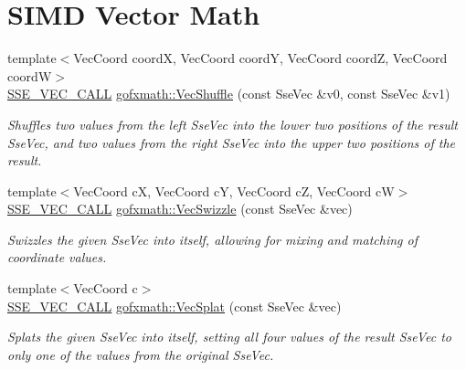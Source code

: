 \hypertarget{group___s_i_m_d_vec_math}{}\section{S\+I\+M\+D Vector Math}
\label{group___s_i_m_d_vec_math}
\begin{DoxyCompactItemize}
\item 
{\footnotesize template$<$Vec\+Coord coord\+X, Vec\+Coord coord\+Y, Vec\+Coord coord\+Z, Vec\+Coord coord\+W$>$ }\\\hyperlink{ssevec__math__defs_8h_a97454f977a5281455cecacce1e8ba670}{S\+S\+E\+\_\+\+V\+E\+C\+\_\+\+C\+A\+L\+L} \hyperlink{group___s_i_m_d_vec_math_ga7b898d302ff9f1463df60c1ca7f03360}{gofxmath\+::\+Vec\+Shuffle} (const Sse\+Vec \&v0, const Sse\+Vec \&v1)
\begin{DoxyCompactList}\small\item\em Shuffles two values from the left Sse\+Vec into the lower two positions of the result Sse\+Vec, and two values from the right Sse\+Vec into the upper two positions of the result. \end{DoxyCompactList}\item 
{\footnotesize template$<$Vec\+Coord c\+X, Vec\+Coord c\+Y, Vec\+Coord c\+Z, Vec\+Coord c\+W$>$ }\\\hyperlink{ssevec__math__defs_8h_a97454f977a5281455cecacce1e8ba670}{S\+S\+E\+\_\+\+V\+E\+C\+\_\+\+C\+A\+L\+L} \hyperlink{group___s_i_m_d_vec_math_ga301067d1f7d26034d5b23f8b1d419856}{gofxmath\+::\+Vec\+Swizzle} (const Sse\+Vec \&vec)
\begin{DoxyCompactList}\small\item\em Swizzles the given Sse\+Vec into itself, allowing for mixing and matching of coordinate values. \end{DoxyCompactList}\item 
{\footnotesize template$<$Vec\+Coord c$>$ }\\\hyperlink{ssevec__math__defs_8h_a97454f977a5281455cecacce1e8ba670}{S\+S\+E\+\_\+\+V\+E\+C\+\_\+\+C\+A\+L\+L} \hyperlink{group___s_i_m_d_vec_math_ga11f32c02b44ae471bedaae3ab1812e1d}{gofxmath\+::\+Vec\+Splat} (const Sse\+Vec \&vec)
\begin{DoxyCompactList}\small\item\em Splats the given Sse\+Vec into itself, setting all four values of the result Sse\+Vec to only one of the values from the original Sse\+Vec. \end{DoxyCompactList}\item 

\end{DoxyCompactItemize}
